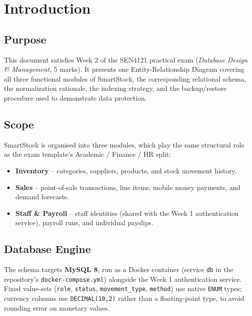 \documentclass[11pt,a4paper]{report}
\newcommand{\sysname}{SmartStock}
\begin{document}
\tableofcontents
\clearpage

\chapter{Introduction}

\section{Purpose}
This document satisfies Week 2 of the SEN4121 practical exam (\emph{Database
Design \& Management}, 5 marks). It presents one Entity-Relationship Diagram
covering all three functional modules of \sysname{}, the corresponding
relational schema, the normalization rationale, the indexing strategy, and
the backup/restore procedure used to demonstrate data protection.

\section{Scope}
\sysname{} is organised into three modules, which play the same structural
role as the exam template's Academic / Finance / HR split:

\begin{itemize}[leftmargin=1.4em]
  \item \textbf{Inventory} -- categories, suppliers, products, and stock
  movement history.
  \item \textbf{Sales} -- point-of-sale transactions, line items, mobile
  money payments, and demand forecasts.
  \item \textbf{Staff \& Payroll} -- staff identities (shared with the Week 1
  authentication service), payroll runs, and individual payslips.
\end{itemize}

\section{Database Engine}
The schema targets \textbf{MySQL 8}, run as a Docker container (service
\texttt{db} in the repository's \texttt{docker-compose.yml}) alongside the
Week 1 authentication service. Fixed value-sets (\texttt{role},
\texttt{status}, \texttt{movement\_type}, \texttt{method}) use native
\texttt{ENUM} types; currency columns use \texttt{DECIMAL(10,2)} rather than
a floating-point type, to avoid rounding error on monetary values.

\end{document}
